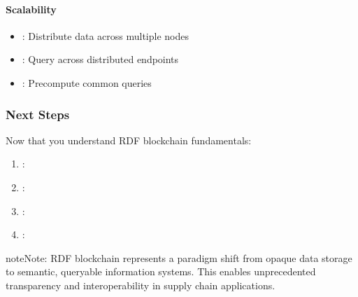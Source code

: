 \documentclass[letterpaper,10pt,english]{sphinxmanual}
\begin{document}
\paragraph{Scalability}
\label{\detokenize{foundational/intro-to-rdf-blockchain:scalability}}\begin{itemize}
\item {} 
\sphinxAtStartPar
{}: Distribute data across multiple nodes

\item {} 
\sphinxAtStartPar
{}: Query across distributed endpoints

\item {} 
\sphinxAtStartPar
{}: Pre\sphinxhyphen{}compute common queries

\end{itemize}


\subsubsection{Next Steps}
\label{\detokenize{foundational/intro-to-rdf-blockchain:next-steps}}
\sphinxAtStartPar
Now that you understand RDF blockchain fundamentals:
\begin{enumerate}
%
\item {} 
\sphinxAtStartPar
{}: {\hyperref[\detokenize{foundational/intro-to-supply-chain-traceability::doc}]{}}

\item {} 
\sphinxAtStartPar
{}: 

\item {} 
\sphinxAtStartPar
{}: 

\item {} 
\sphinxAtStartPar
{}: {\hyperref[\detokenize{stack/intro-to-stack::doc}]{}}

\end{enumerate}

\begin{sphinxadmonition}{note}{Note:}
\sphinxAtStartPar
RDF blockchain represents a paradigm shift from opaque data storage to semantic, queryable information systems. This enables unprecedented transparency and interoperability in supply chain applications.
\end{sphinxadmonition}
\end{document}
